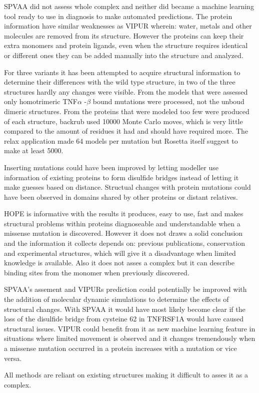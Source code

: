 SPVAA did not assess whole complex and neither did became a machine learning tool ready to use in diagnosis to make automated predictions. The protein information have similar weaknesses as VIPUR wherein: water, metals and other molecules are removed from its structure. However the proteins can keep their extra monomers and protein ligands, even when the structure requires identical or different ones they can be added manually into the structure and analyzed. 

For three variants it has been attempted to acquire structural information to determine their differences with the wild type structure, in two of the three structures hardly any changes were visible. From the models that were assessed only homotrimeric TNF$\alpha$ -$\beta$ bound mutations were processed, not the unboud dimeric structures. From the proteins that were modeled too few were produced of each structure, backrub used 10000 Monte Carlo moves, which is very little compared to the amount of residues it had and should have required more. The relax application made 64 models per mutation but Rosetta itself suggest to make at least 5000\cite{}.

Inserting mutations could have been improved by letting modeller use information of existing proteins to form disulfide bridges instead of letting it make guesses based on distance. Structual changes with protein mutations could have been observed in domains shared by other proteins or distant relatives.

HOPE is informative with the results it produces, easy to use, fast and makes structural problems within proteins diagnoseable and understandable when a missense mutation is discovered. However it does not draws a solid conclusion and the information it collects depends on: previous publications, conservation and experimental structures, which will give it a disadvantage when limited knowledge is available. Also it does not asses a complex but it can describe binding sites from the monomer when previously discovered.


SPVAA's assement and VIPURs prediction could potentially be improved with the addition of molecular dynamic simulations to determine the effects of structural changes. With SPVAA it would have most likely become clear if the loss of the disulfide bridge from cysteine 62 in TNFRSF1A would have caused structural issues. VIPUR could benefit from it as new machine learning feature in situations where limited movement is observed and it changes tremendously when a missense mutation occurred in a protein increases with a mutation or vice versa.



All methods are reliant on existing structures making it difficult to asses it as a complex.
